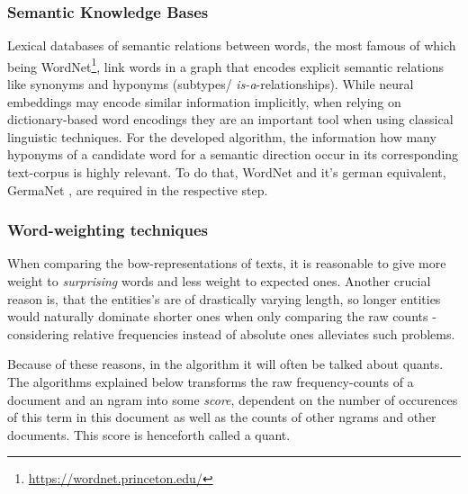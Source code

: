 \subsubsection*{Semantic Knowledge Bases}

Lexical databases of semantic relations between words, the most famous of which being WordNet\footnote{\url{https://wordnet.princeton.edu/}}, link words in a graph that encodes explicit semantic relations like synonyms and hyponyms (subtypes/ \emph{is-a}-relationships). While neural %
embeddings may encode similar information implicitly, when relying on dictionary-based word encodings they are an important tool when using classical linguistic techniques. For the developed algorithm, the information how many hyponyms of a candidate word for a semantic direction %
occur in its corresponding text-corpus is highly relevant. To do that, WordNet \cite{Miller1995} and it's german equivalent, GermaNet \cite{hamp-feldweg-1997-germanet,Henrich}, are required in the respective step.


\subsubsection*{Word-weighting techniques}

\label{sec:word_count_techniques}

When comparing the \gls{bow}-representations of texts, it is reasonable to give more weight to \emph{surprising} words and less weight to expected ones.  \cite[156]{Turney2010} 
Another crucial reason is, that the entities's are of drastically varying length, so longer entities would naturally dominate shorter ones when only comparing the raw counts - considering relative frequencies instead of absolute ones alleviates such problems.

Because of these reasons, in the algorithm it will often be talked about \glspl{quant}. The algorithms explained below transforms the raw frequency-counts of a document and an \gls{ngram} into some \emph{score}, dependent on the number of occurences of this term in this document as well as the counts of other \glspl{ngram} and other documents. This score is henceforth called a \gls{quant}.



